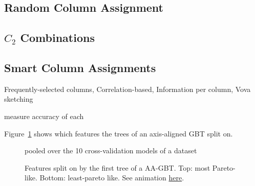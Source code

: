 \documentclass[sigconf,screen]{acmart}
\begin{document}
\subsection{Random Column Assignment}

\subsection{\texorpdfstring{$C_2$}{C2} Combinations}

\subsection{Smart Column Assignments}

Frequently-selected columns, Correlation-based, Information per column, Vova sketching

measure accuracy of each

Figure~\ref{fig:cc18-tree-feature-hist} shows which features the trees of an axis-aligned GBT split on.

\begin{figure}[t]
\centering

\caption{Features split on by the first tree of a AA-GBT. Top: most Pareto-like. Bottom: least-pareto like. See animation \href{https://drive.google.com/file/d/1BLq98ab_YEgCxTeb6eLGhEEZw2BVsqCO/view?usp=drive_link}{here}.}
\label{fig:cc18-tree-feature-hist}
\par\smallskip\raggedright\footnotesize pooled over the 10 cross-validation models of a dataset
\end{figure}
\end{document}
